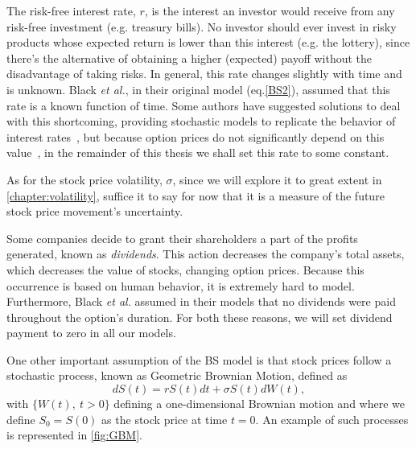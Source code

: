 The risk-free interest rate, $r$, is the interest an investor would receive from any risk-free investment (e.g. treasury bills). No investor should ever invest in risky products whose expected return is lower than this interest (e.g. the lottery), since there's the alternative of obtaining a higher (expected) payoff without the disadvantage of taking risks. In general, this rate changes slightly with time and is unknown. Black \textit{et al.}, in their original model (eq.\eqref{BS2}), assumed that this rate is a known function of time. Some authors have suggested solutions to deal with this shortcoming, providing stochastic models to replicate the behavior of interest rates~\citep{HJM}, but because option prices do not significantly depend on this value~\citep{Wilmott3}, in the remainder of this thesis we shall set this rate to some constant.

As for the stock price volatility, $\sigma$, since we will explore it to great extent in \autoref{chapter:volatility}, suffice it to say for now that it is a measure of the future stock price movement's uncertainty.

Some companies decide to grant their shareholders a part of the profits generated, known as \emph{dividends}. This action decreases the company's total assets, which decreases the value of stocks, changing option prices. Because this occurrence is based on human behavior, it is extremely hard to model. Furthermore, Black \textit{et al.} assumed in their models that no dividends were paid throughout the option's duration. For both these reasons, we will set dividend payment to zero in all our models.


One other important assumption of the BS model is that stock prices follow a stochastic process, known as Geometric Brownian Motion, defined as
\begin{equation}\label{GBM}
dS(t)=rS(t)dt+\sigma S(t)dW(t),
\end{equation}
\noindent with $\{W(t),\ t>0\}$ defining a one-dimensional Brownian motion and where we define $S_0=S(0)$ as the stock price at time $t=0$. An example of such processes is represented in \autoref{fig:GBM}.

